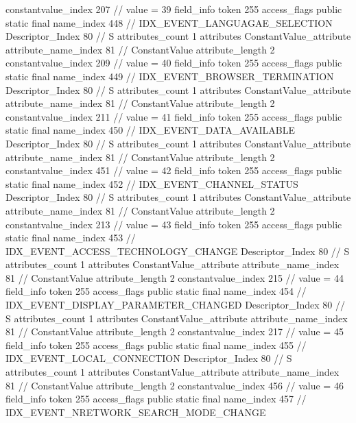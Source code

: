 {{{{{{{					constantvalue_index	207		// value = 39
				}
				}
			}
			field_info {
				token	255
				access_flags	public static final
				name_index	448		// IDX_EVENT_LANGUAGAE_SELECTION
				Descriptor_Index	80		// S
				attributes_count	1
				attributes {
				ConstantValue_attribute {
					attribute_name_index	81		// ConstantValue
					attribute_length	2
					constantvalue_index	209		// value = 40
				}
				}
			}
			field_info {
				token	255
				access_flags	public static final
				name_index	449		// IDX_EVENT_BROWSER_TERMINATION
				Descriptor_Index	80		// S
				attributes_count	1
				attributes {
				ConstantValue_attribute {
					attribute_name_index	81		// ConstantValue
					attribute_length	2
					constantvalue_index	211		// value = 41
				}
				}
			}
			field_info {
				token	255
				access_flags	public static final
				name_index	450		// IDX_EVENT_DATA_AVAILABLE
				Descriptor_Index	80		// S
				attributes_count	1
				attributes {
				ConstantValue_attribute {
					attribute_name_index	81		// ConstantValue
					attribute_length	2
					constantvalue_index	451		// value = 42
				}
				}
			}
			field_info {
				token	255
				access_flags	public static final
				name_index	452		// IDX_EVENT_CHANNEL_STATUS
				Descriptor_Index	80		// S
				attributes_count	1
				attributes {
				ConstantValue_attribute {
					attribute_name_index	81		// ConstantValue
					attribute_length	2
					constantvalue_index	213		// value = 43
				}
				}
			}
			field_info {
				token	255
				access_flags	public static final
				name_index	453		// IDX_EVENT_ACCESS_TECHNOLOGY_CHANGE
				Descriptor_Index	80		// S
				attributes_count	1
				attributes {
				ConstantValue_attribute {
					attribute_name_index	81		// ConstantValue
					attribute_length	2
					constantvalue_index	215		// value = 44
				}
				}
			}
			field_info {
				token	255
				access_flags	public static final
				name_index	454		// IDX_EVENT_DISPLAY_PARAMETER_CHANGED
				Descriptor_Index	80		// S
				attributes_count	1
				attributes {
				ConstantValue_attribute {
					attribute_name_index	81		// ConstantValue
					attribute_length	2
					constantvalue_index	217		// value = 45
				}
				}
			}
			field_info {
				token	255
				access_flags	public static final
				name_index	455		// IDX_EVENT_LOCAL_CONNECTION
				Descriptor_Index	80		// S
				attributes_count	1
				attributes {
				ConstantValue_attribute {
					attribute_name_index	81		// ConstantValue
					attribute_length	2
					constantvalue_index	456		// value = 46
				}
				}
			}
			field_info {
				token	255
				access_flags	public static final
				name_index	457		// IDX_EVENT_NRETWORK_SEARCH_MODE_CHANGE
}}}}}

